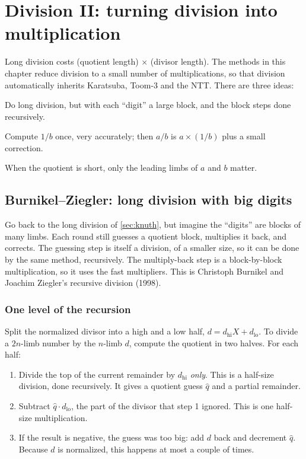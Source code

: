 \chapter{Division II: turning division into multiplication}
\label{ch:fastdiv}

Long division costs (quotient length) $\times$ (divisor length). The methods in this chapter
reduce division to a small number of multiplications, so that division automatically
inherits Karatsuba, Toom-3 and the NTT. There are three ideas:

\begin{description}[leftmargin=2.8cm,style=sameline]
  \item[Burnikel--Ziegler] Do long division, but with each ``digit'' a large block, and the
        block steps done recursively.
  \item[Newton] Compute $1/b$ once, very accurately; then $a/b$ is $a \times (1/b)$ plus a
        small correction.
  \item[Top limbs] When the quotient is short, only the leading limbs of $a$ and $b$ matter.
\end{description}

\section{Burnikel--Ziegler: long division with big digits}
\label{sec:bz}

Go back to the long division of \cref{sec:knuth}, but imagine the ``digits'' are blocks of
many limbs. Each round still guesses a quotient block, multiplies it back, and corrects. The
guessing step is itself a division, of a smaller size, so it can be done by the same method,
recursively. The multiply-back step is a block-by-block multiplication, so it uses the fast
multipliers. This is Christoph Burnikel and Joachim Ziegler's recursive division (1998).

\subsection{One level of the recursion}

Split the normalized divisor into a high and a low half, $d = d_{\text{hi}} X + d_{\text{lo}}$.
To divide a $2n$-limb number by the $n$-limb $d$, compute the quotient in two halves. For each
half:

\begin{enumerate}
  \item Divide the top of the current remainder by $d_{\text{hi}}$ \emph{only}. This is a
        half-size division, done recursively. It gives a quotient guess $\hat q$ and a partial
        remainder.
  \item Subtract $\hat q \cdot d_{\text{lo}}$, the part of the divisor that step 1 ignored. This is
        one half-size multiplication.
  \item If the result is negative, the guess was too big: add $d$ back and decrement $\hat q$.
        Because $d$ is normalized, this happens at most a couple of times.
\end{enumerate}

